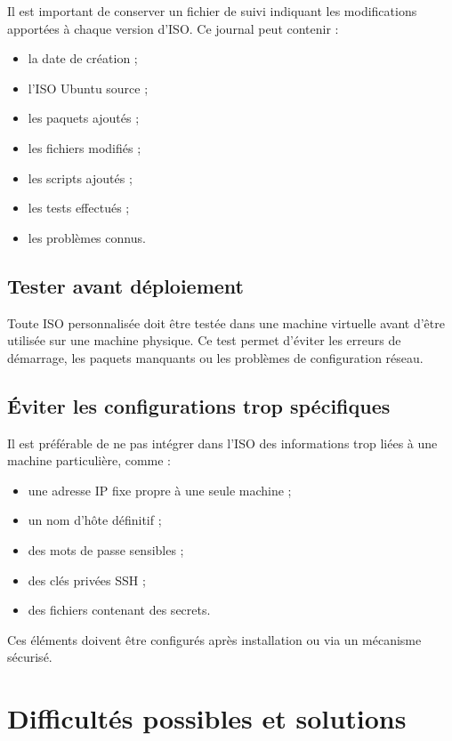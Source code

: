 \documentclass[12pt,a4paper]{article}
\begin{document}
Il est important de conserver un fichier de suivi indiquant les modifications apportées à chaque version d'ISO. Ce journal peut contenir :

\begin{itemize}[label=--]
    \item la date de création ;
    \item l'ISO Ubuntu source ;
    \item les paquets ajoutés ;
    \item les fichiers modifiés ;
    \item les scripts ajoutés ;
    \item les tests effectués ;
    \item les problèmes connus.
\end{itemize}

\subsection{Tester avant déploiement}

Toute ISO personnalisée doit être testée dans une machine virtuelle avant d'être utilisée sur une machine physique. Ce test permet d'éviter les erreurs de démarrage, les paquets manquants ou les problèmes de configuration réseau.

\subsection{Éviter les configurations trop spécifiques}

Il est préférable de ne pas intégrer dans l'ISO des informations trop liées à une machine particulière, comme :

\begin{itemize}[label=--]
    \item une adresse IP fixe propre à une seule machine ;
    \item un nom d'hôte définitif ;
    \item des mots de passe sensibles ;
    \item des clés privées SSH ;
    \item des fichiers contenant des secrets.
\end{itemize}

Ces éléments doivent être configurés après installation ou via un mécanisme sécurisé.

\section{Difficultés possibles et solutions}
\end{document}
